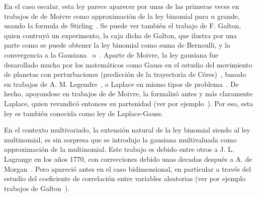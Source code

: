 \label{Sssec:MP:Gaussiana}

En el caso escalar,  esta ley parece aparecer por unas de  las primeras veces en
trabajos de de  Moivre como approximaci\'on de la ley  binomial para $n$ grande,
usando la formula de Stirling~\cite{Moi30, Moi33, Moi56, Pea24, PeaMoi26, Dem33,
  Hal84, Hal90,  JohKot95:v1, Hal06}.  Se puede  ver tambi\'en el  trabajo de F.
Galton, quien  contruy\'o un experimento, la  caja dicha de  Galton, que ilustra
por una parte como se puede obtener la ley binomial como suma de Bernoulli, y la
convergencia a la Gausiana~\cite[Figs.~7-9, p.~63]{Gal89} o~\cite[p.~38]{Pea20}.
Aparte de  Moivre, la ley gausiana  fue desarollado mucho  por los matem\'aticos
como  Gauss  en  el  estudio  del  movimiento  de  planetas  con  perturbaciones
(predicci\'on de  la trayectoria de C\'eres)~\cite{Gau09,  Pea24, Hal06}, basado
en trabajos de A.  M.  Legendre~\cite{Leg05, Hal06}, o Laplace en mismo tipos de
problema~\cite{Lap09, Lap09:Supp, Lap12, Lap14, Lap20, Pea24, Hal06}.  De hecho,
apoyandose en  trabajos de  de Moivre, la  formaliz\'o antes y  m\'as claramente
Laplace,    quien    revandic\'o     entonces    su    partenidad    (ver    por
ejemplo~\cite{Pea20}).   Por eso,  esta ley  es tambi\'en  conocida como  ley de
Laplace-Gauss.

En el contexto multivariado, la extensi\'on natural de la ley binomial siendo al
ley multinomial, es sin sorpresa  que se introdujo la gausiana multivaluada como
approximaci\'on de la multinomial.  Este trabajo  es debido entre otros a J.  L.
Lagrange en  los a\~nos 1770, con  correcciones debido unas  decadas despu\'es a
A. de  Morgan~\cite{Mor38}. Pero apareci\'o  antes en el caso  bidimensional, en
particular  a  trav\'es  del  estudio  del coeficiente  de  correlaci\'on  entre
variables   aleatorias  (ver   por  ejemplo   trabajos   de  Galton~\cite{Gal77,
  Gal77:Nature, Pea20}).


